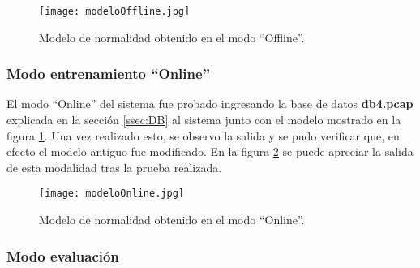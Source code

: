 \begin{figure}[tb]
\begin{center}
\texttt{[image: modeloOffline.jpg]}
\caption{Modelo de normalidad obtenido en el modo ``Offline''.}
\label{fig:modeloOffline}
\end{center}
\end{figure}

\subsubsection{Modo entrenamiento ``Online''}

El modo ``Online'' del sistema fue probado ingresando la base de datos \textbf{db4.pcap} explicada en la sección \ref{ssec:DB} al sistema junto con el modelo mostrado en la figura \ref{fig:modeloOffline}. Una vez realizado esto, se observo la salida y se pudo verificar que, en efecto el modelo antiguo fue modificado. En la figura \ref{fig:modeloOnline} se puede apreciar la salida de esta modalidad tras la prueba realizada.

\begin{figure}[tb]
\begin{center}
\texttt{[image: modeloOnline.jpg]}
\caption{Modelo de normalidad obtenido en el modo ``Online''.}
\label{fig:modeloOnline}
\end{center}
\end{figure}

\subsubsection{Modo evaluación}


